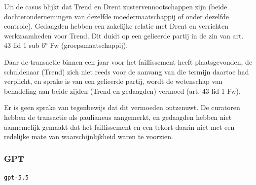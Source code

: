 \documentclass[
  dutch,
  a4paper,
]{article}
\begin{document}
Uit de casus blijkt dat Trend en Drent zustervennootschappen zijn (beide dochterondernemingen van dezelfde moedermaatschappij of onder dezelfde controle). Gedaagden hebben een zakelijke relatie met Drent en verrichten werkzaamheden voor Trend. Dit duidt op een gelieerde partij in de zin van art. 43 lid 1 sub 6° Fw (groepsmaatschappij).

Daar de transactie binnen een jaar voor het faillissement heeft plaatsgevonden, de schuldenaar (Trend) zich niet reeds voor de aanvang van die termijn daartoe had verplicht, en sprake is van een gelieerde partij, wordt de wetenschap van benadeling aan beide zijden (Trend en gedaagden) vermoed (art. 43 lid 1 Fw).

Er is geen sprake van tegenbewijs dat dit vermoeden ontzenuwt. De curatoren hebben de transactie als paulianeus aangemerkt, en gedaagden hebben niet aannemelijk gemaakt dat het faillissement en een tekort daarin niet met een redelijke mate van waarschijnlijkheid waren te voorzien.

\newpage


\subsubsection{GPT}\label{gpt-22}

\texttt{gpt-5.5}
\end{document}
